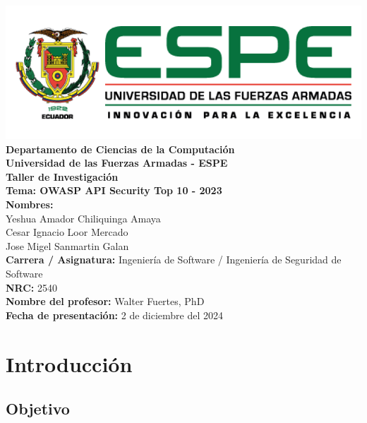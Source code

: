 \documentclass[a4paper,12pt]{article}
\begin{document}
\begin{titlepage}
    \centering
    \vspace*{1cm}
    \includegraphics[width=0.8\linewidth]{espe.png}\\[0.5cm]
    
    \Large \textbf{Departamento de Ciencias de la Computación}\\
    \large \textbf{Universidad de las Fuerzas Armadas - ESPE}\\[0.5cm]
    
    \Huge \textbf{Taller de Investigación}\\[0.3cm]
    \Large \textbf{Tema: OWASP API Security Top 10 - 2023}\\[0.8cm]
    
    \textbf{Nombres:}\\
    Yeshua Amador Chiliquinga Amaya\\
    Cesar Ignacio Loor Mercado\\
    Jose Migel Sanmartin Galan\\[0.3cm]
    
    \textbf{Carrera / Asignatura:} Ingeniería de Software / Ingeniería de Seguridad de Software\\
    \textbf{NRC:} 2540\\
    \textbf{Nombre del profesor:} Walter Fuertes, PhD\\[0.5cm]
    
    \textbf{Fecha de presentación:} 2 de diciembre del 2024\\[1cm]
    
    \vfill
\end{titlepage}
\tableofcontents
\newpage

\section{Introducción}

\subsection{Objetivo}
\end{document}

